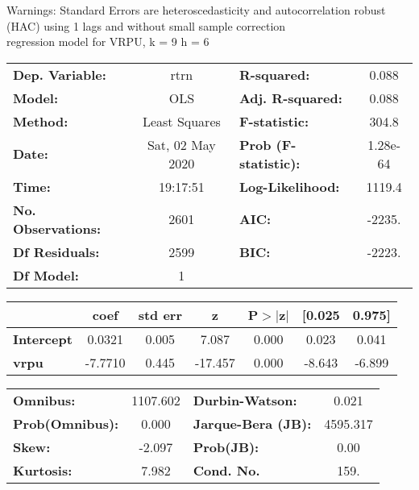 Warnings: \newline
 [1] Standard Errors are heteroscedasticity and autocorrelation robust (HAC) using 1 lags and without small sample correction\\ 

regression model for VRPU, k = 9 h = 6\begin{center}
\begin{tabular}{lclc}
\toprule
\textbf{Dep. Variable:}    &       rtrn       & \textbf{  R-squared:         } &     0.088   \\
\textbf{Model:}            &       OLS        & \textbf{  Adj. R-squared:    } &     0.088   \\
\textbf{Method:}           &  Least Squares   & \textbf{  F-statistic:       } &     304.8   \\
\textbf{Date:}             & Sat, 02 May 2020 & \textbf{  Prob (F-statistic):} &  1.28e-64   \\
\textbf{Time:}             &     19:17:51     & \textbf{  Log-Likelihood:    } &    1119.4   \\
\textbf{No. Observations:} &        2601      & \textbf{  AIC:               } &    -2235.   \\
\textbf{Df Residuals:}     &        2599      & \textbf{  BIC:               } &    -2223.   \\
\textbf{Df Model:}         &           1      & \textbf{                     } &             \\
\bottomrule
\end{tabular}
\begin{tabular}{lcccccc}
                   & \textbf{coef} & \textbf{std err} & \textbf{z} & \textbf{P$> |$z$|$} & \textbf{[0.025} & \textbf{0.975]}  \\
\midrule
\textbf{Intercept} &       0.0321  &        0.005     &     7.087  &         0.000        &        0.023    &        0.041     \\
\textbf{vrpu}      &      -7.7710  &        0.445     &   -17.457  &         0.000        &       -8.643    &       -6.899     \\
\bottomrule
\end{tabular}
\begin{tabular}{lclc}
\textbf{Omnibus:}       & 1107.602 & \textbf{  Durbin-Watson:     } &    0.021  \\
\textbf{Prob(Omnibus):} &   0.000  & \textbf{  Jarque-Bera (JB):  } & 4595.317  \\
\textbf{Skew:}          &  -2.097  & \textbf{  Prob(JB):          } &     0.00  \\
\textbf{Kurtosis:}      &   7.982  & \textbf{  Cond. No.          } &     159.  \\
\bottomrule
\end{tabular}
\end{center}

